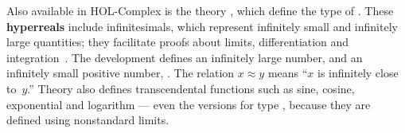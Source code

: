 Also available in HOL-Complex is the
theory , which define the type  of 
.  These
\textbf{hyperreals} include infinitesimals, which represent infinitely
small and infinitely large quantities; they facilitate proofs
about limits, differentiation and integration~\cite{fleuriot-jcm}.  The
development defines an infinitely large number,  and an
infinitely small positive number, .  The 
relation $x\approx y$ means ``$x$ is infinitely close to~$y$.''
Theory  also defines transcendental functions such as sine,
cosine, exponential and logarithm --- even the versions for type
, because they are defined using nonstandard limits.%
